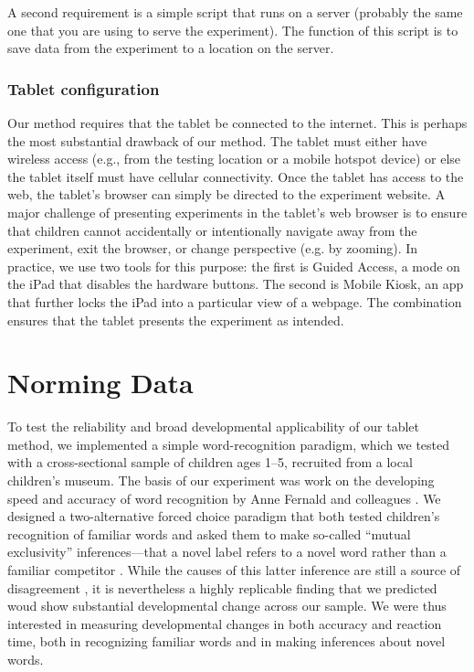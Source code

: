 \documentclass[man,noapacite]{apa2}
\begin{document}
A second requirement is a simple script that runs on a server (probably the same one that you are using to serve the experiment). The function of this script is to save data from the experiment to a location on the server.

\subsubsection{Tablet configuration}

Our method requires that the tablet be connected to the internet. This is perhaps the most substantial drawback of our method. The tablet must either have wireless access (e.g., from the testing location or a mobile hotspot device) or else the tablet itself must have cellular connectivity. Once the tablet has access to the web, the tablet's browser can simply be directed to the experiment website. A major challenge of presenting experiments in the tablet's web browser is to ensure that children cannot accidentally or intentionally navigate away from the experiment, exit the browser, or change perspective (e.g. by zooming).
In practice, we use two tools for this purpose: the first is Guided Access, a mode on the iPad that disables the hardware buttons. The second is Mobile Kiosk, an app that further locks the iPad into a particular view of a webpage. The combination ensures that the tablet presents the experiment as intended.



\section{Norming Data}
 
To test the reliability and broad developmental applicability of our tablet method, we implemented a simple word-recognition paradigm, which we tested with a cross-sectional sample of children ages 1--5, recruited from a local children's museum. The basis of our experiment was work on the developing speed and accuracy of word recognition by Anne Fernald and colleagues \cite{fernald1998,fernald2002,bion2012}. We designed a two-alternative forced choice paradigm that both tested children's recognition of familiar words and asked them to make so-called ``mutual exclusivity'' inferences---that a novel label refers to a novel word rather than a familiar competitor \cite{markman1989}. While the causes of this latter inference are still a source of disagreement \cite{markman2003,diesendruck2003,frank2009,bion2012}, it is nevertheless a highly replicable finding that we predicted woud show substantial developmental change across our sample.  We were thus interested in measuring developmental changes in both accuracy and reaction time, both in recognizing familiar words and in making inferences about novel words. 
\end{document}
